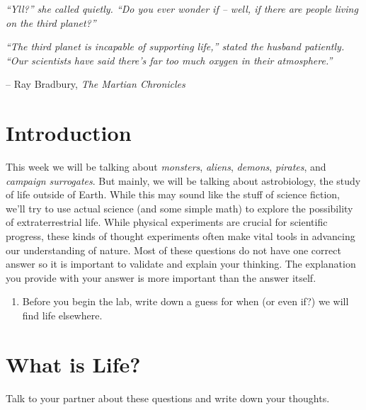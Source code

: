 \documentclass[10pt]{article}%
\begin{document}
\textit{``Yll?'' she called quietly. ``Do you ever wonder if -- well, if there \emph{are} people living on the third planet?''}

\textit{``The third planet is incapable of supporting life,'' stated the husband patiently. ``Our scientists have said there's far too much oxygen in their atmosphere.''} 
\begin{center}
-- Ray Bradbury, \textit{The Martian Chronicles}
\end{center} 


\section{Introduction}

This week we will be talking about \textit{monsters}, \textit{aliens}, \textit{demons}, \textit{pirates}, and \textit{campaign surrogates}. But mainly, we will be talking about astrobiology, the study of life outside of Earth.   While this may sound like the stuff of science fiction, we'll try to use actual science (and some simple math) to explore the possibility of extraterrestrial life. While physical experiments are crucial for scientific progress, these kinds of thought experiments often make vital tools in advancing our understanding of nature.  Most of these questions do not have one correct answer so it is important to validate and explain your thinking. The explanation you provide with your answer is more important than the answer itself. 

\begin{enumerate}
    \item Before you begin the lab, write down a guess for when (or even if?) we will find life elsewhere. 
\end{enumerate}


\section{What is Life?}
Talk to your partner about these questions and write down your thoughts. 
\end{document}
